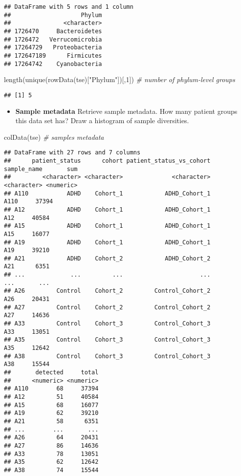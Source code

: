 \documentclass[
  oneside]{book}
\newenvironment{Shaded}{\begin{snugshade}}{\end{snugshade}}
\newcommand{\CommentTok}[1]{\textcolor[rgb]{0.56,0.35,0.01}{\textit{#1}}}
\newcommand{\DecValTok}[1]{\textcolor[rgb]{0.00,0.00,0.81}{#1}}
\newcommand{\FunctionTok}[1]{\textcolor[rgb]{0.00,0.00,0.00}{#1}}
\newcommand{\NormalTok}[1]{#1}
\newcommand{\StringTok}[1]{\textcolor[rgb]{0.31,0.60,0.02}{#1}}
\providecommand{\tightlist}{%
  \setlength{\itemsep}{0pt}\setlength{\parskip}{0pt}}
\begin{document}
\begin{verbatim}
## DataFrame with 5 rows and 1 column
##                    Phylum
##               <character>
## 1726470     Bacteroidetes
## 1726472   Verrucomicrobia
## 17264729   Proteobacteria
## 172647189      Firmicutes
## 17264742    Cyanobacteria
\end{verbatim}

\begin{Shaded}
\begin{Highlighting}[]
\FunctionTok{length}\NormalTok{(}\FunctionTok{unique}\NormalTok{(}\FunctionTok{rowData}\NormalTok{(tse)[}\StringTok{"Phylum"}\NormalTok{])[,}\DecValTok{1}\NormalTok{]) }\CommentTok{\# number of phylum{-}level groups}
\end{Highlighting}
\end{Shaded}

\begin{verbatim}
## [1] 5
\end{verbatim}

\begin{itemize}
\tightlist
\item
  \textbf{Sample metadata} Retrieve sample metadata. How many patient
  groups this data set has? Draw a histogram of sample
  diversities.
\end{itemize}

\begin{Shaded}
\begin{Highlighting}[]
\FunctionTok{colData}\NormalTok{(tse) }\CommentTok{\# samples metadata}
\end{Highlighting}
\end{Shaded}

\begin{verbatim}
## DataFrame with 27 rows and 7 columns
##      patient_status      cohort patient_status_vs_cohort sample_name       sum
##         <character> <character>              <character> <character> <numeric>
## A110           ADHD    Cohort_1            ADHD_Cohort_1        A110     37394
## A12            ADHD    Cohort_1            ADHD_Cohort_1         A12     40584
## A15            ADHD    Cohort_1            ADHD_Cohort_1         A15     16077
## A19            ADHD    Cohort_1            ADHD_Cohort_1         A19     39210
## A21            ADHD    Cohort_2            ADHD_Cohort_2         A21      6351
## ...             ...         ...                      ...         ...       ...
## A26         Control    Cohort_2         Control_Cohort_2         A26     20431
## A27         Control    Cohort_2         Control_Cohort_2         A27     14636
## A33         Control    Cohort_3         Control_Cohort_3         A33     13051
## A35         Control    Cohort_3         Control_Cohort_3         A35     12642
## A38         Control    Cohort_3         Control_Cohort_3         A38     15544
##       detected     total
##      <numeric> <numeric>
## A110        68     37394
## A12         51     40584
## A15         68     16077
## A19         62     39210
## A21         58      6351
## ...        ...       ...
## A26         64     20431
## A27         86     14636
## A33         78     13051
## A35         62     12642
## A38         74     15544
\end{verbatim}
\end{document}
